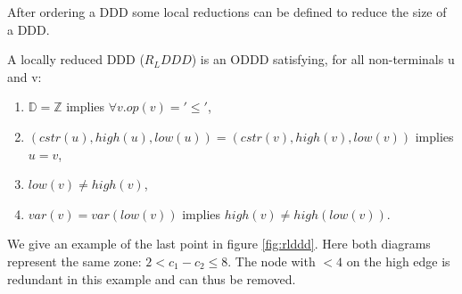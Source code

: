 After ordering a DDD some local reductions can be defined to reduce the size of a DDD.

\begin{mydef}
\label{def:RLDDD}
A locally reduced DDD ($R_LDDD$) is an ODDD satisfying, for all non-terminals u and v:
\begin{enumerate}
  \item $\mathbb{D} = \mathbb{Z}$ implies $\forall v. op(v) = '\leq'$,
  \item $(cstr(u),high(u),low(u)) = (cstr(v),high(v),low(v))$ implies $u = v$,
  \item $low(v) \neq high(v)$,
  \item $var(v) = var(low(v))$ implies $high(v) \neq high(low(v))$.
\end{enumerate}
\end{mydef}

We give an example of the last point in figure \ref{fig:rlddd}. Here both diagrams represent the same zone: $2 < c_1 - c_2 \leq 8$. The node with $< 4$ on the high edge is redundant in this example and can thus be removed. 

